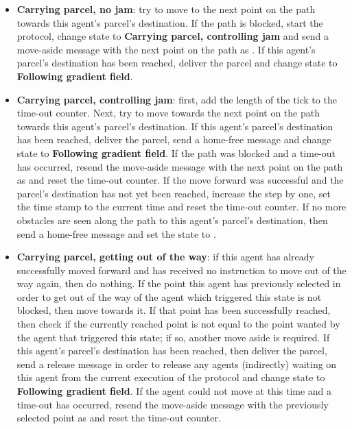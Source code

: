 \begin{itemize}
    \item \textbf{Carrying parcel, no jam}: try to move to the next point on the path towards this agent's parcel's destination. If the path is blocked, start the protocol, change state to \textbf{Carrying parcel, controlling jam} and send a move-aside message with the next point on the path as . If this agent's parcel's destination has been reached, deliver the parcel and change state to \textbf{Following gradient field}.
    \item \textbf{Carrying parcel, controlling jam}: first, add the length of the tick to the time-out counter. Next, try to move towards the next point on the path towards this agent's parcel's destination. If this agent's parcel's destination has been reached, deliver the parcel, send a home-free message and change state to \textbf{Following gradient field}. If the path was blocked and a time-out has occurred, resend the move-aside message with the next point on the path as  and reset the time-out counter. If the move forward was successful and the parcel's destination has not yet been reached, increase the step by one, set the time stamp to the current time and reset the time-out counter. If no more obstacles are seen along the path to this agent's parcel's destination, then send a home-free message and set the state to .
    \item \textbf{Carrying parcel, getting out of the way}: if this agent has already successfully moved forward and has received no instruction to move out of the way again, then do nothing. If the point this agent has previously selected in order to get out of the way of the agent which triggered this state is not blocked, then move towards it. If that point has been successfully reached, then check if the currently reached point is not equal to the point wanted by the agent that triggered this state; if so, another move aside is required. If this agent's parcel's destination has been reached, then deliver the parcel, send a release message in order to release any agents (indirectly) waiting on this agent from the current execution of the protocol and change state to \textbf{Following gradient field}. If the agent could not move at this time and a time-out has occurred, resend the move-aside message with the previously selected point as  and reset the time-out counter.

\end{itemize}
